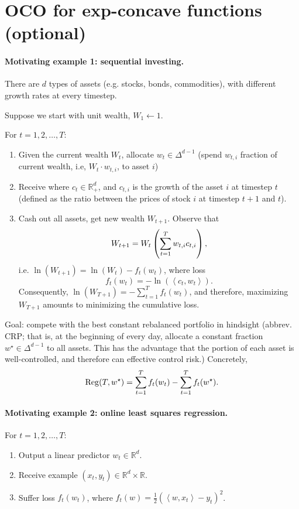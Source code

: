 \documentclass{article}
\DeclareMathOperator*{\Reg}{{\rm Reg}}
\newcommand{\RR}{\mathbb{R}} %
\newcommand{\inner}[2]{\left\langle #1,#2 \right\rangle}
\begin{document}

\section{OCO for exp-concave functions (optional)}

\paragraph{Motivating example 1: sequential investing.} There are $d$ types of assets (e.g. stocks, bonds, commodities), with different growth rates at every timestep.

Suppose we start with unit wealth, $W_1 \gets 1$.

For $t = 1,2,\ldots,T$:
\begin{enumerate}
\item Given the current wealth $W_t$, allocate $w_t \in \Delta^{d-1}$ (spend $w_{t,i}$ fraction of current wealth, i.e, $W_t \cdot w_{t,i}$, to asset $i$)
\item Receive where $c_t \in \RR^d_+$, and $c_{t,i}$ is the growth of the asset $i$ at timestep $t$ (defined as the ratio between the prices of stock $i$ at timestep $t+1$ and $t$).
\item Cash out all assets, get new wealth $W_{t+1}$. Observe that
\[ W_{t+1} = W_t \del{\sum_{t=1}^T w_{t,i} c_{t,i}}, \]
i.e. $\ln(W_{t+1}) = \ln(W_t) - f_t(w_t)$, where loss
\[ f_t(w_t) = -\ln(\inner{c_t}{w_t}).\]
Consequently, $\ln(W_{T+1}) = -\sum_{t=1}^T f_t(w_t)$, and therefore, maximizing $W_{T+1}$ amounts to minimizing the cumulative loss.
\end{enumerate}

Goal: compete with the best constant rebalanced portfolio in hindsight (abbrev. CRP; that is, at the beginning of every day, allocate a constant fraction $w^\star \in \Delta^{d-1}$ to all assets. This has the advantage that the portion of each asset is well-controlled, and therefore can effective control risk.)
Concretely,
\[ \Reg(T, w^\star) = \sum_{t=1}^T f_t(w_t) - \sum_{t=1}^T f_t(w^\star). \]


\paragraph{Motivating example 2: online least squares regression.}

For $t = 1,2,\ldots,T$:
\begin{enumerate}
\item Output a linear predictor $w_t \in \RR^d$.
\item Receive example $(x_t, y_t) \in \RR^d \times \RR$.
\item Suffer loss $f_t(w_t)$, where $f_t(w) = \frac12(\inner{w}{x_t} - y_t)^2$.
\end{enumerate}
\end{document}
